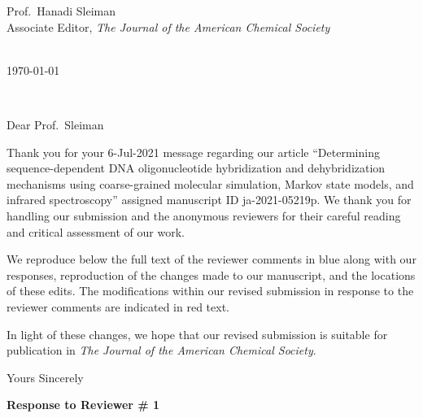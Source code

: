 \documentclass[11pt,a4paper]{letter} %
\makeatletter
\def\opening#1{\thispagestyle{empty}
{\centering\fromaddress \vspace{1.1in} \\ %
%
\hspace*{4.15 in}\today\hspace*{\fill}\par
} %
{\raggedright \toname \\ \toaddress \par} %
\vspace{0.05in} %
\noindent #1 %
}
\makeatother
\begin{document}

\begin{letter}
{
Prof.\ Hanadi Sleiman \\
Associate Editor, \textit{The Journal of the American Chemical Society}
}


\opening{Dear Prof.\ Sleiman}

Thank you for your 6-Jul-2021 message regarding our article ``Determining sequence-dependent DNA oligonucleotide hybridization and dehybridization mechanisms using coarse-grained molecular simulation, Markov state models, and infrared spectroscopy'' assigned manuscript ID ja-2021-05219p. We thank you for handling our submission and the anonymous reviewers for their careful reading and critical assessment of our work.

We reproduce below the full text of the reviewer comments in blue along with our responses, reproduction of the changes made to our manuscript, and the locations of these edits. The modifications within our revised submission in response to the reviewer comments are indicated in red text. 

In light of these changes, we hope that our revised submission is suitable for publication in \textit{The Journal of the American Chemical Society}.

\closing{Yours Sincerely}

\end{letter}


\clearpage
\newpage

\begin{shaded}
\textbf{Response to Reviewer \# 1}
\end{shaded}
\end{document}
